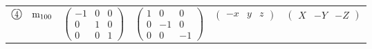 \documentclass[fleqn,10pt,landscape]{jsarticle}
\begin{document}
\begin{center}
\begin{longtable}{lcccc}
$ {\ooalign{\hfil\resizebox{.8\width}{\height}{4}\hfil\crcr\raise.1ex\hbox{\large$\bigcirc$}}}\quad {\rm m}_{100} $ & $ \begin{pmatrix} -1 & 0 & 0 \\ 0 & 1 & 0 \\ 0 & 0 & 1 \end{pmatrix} $ & $ \begin{pmatrix} 1 & 0 & 0 \\ 0 & -1 & 0 \\ 0 & 0 & -1 \end{pmatrix} $ & $ \begin{pmatrix} - x & y & z \end{pmatrix} $ & $ \begin{pmatrix} X & - Y & - Z \end{pmatrix} $ \\
\end{longtable}
\end{center}
\newpage
\end{document}

